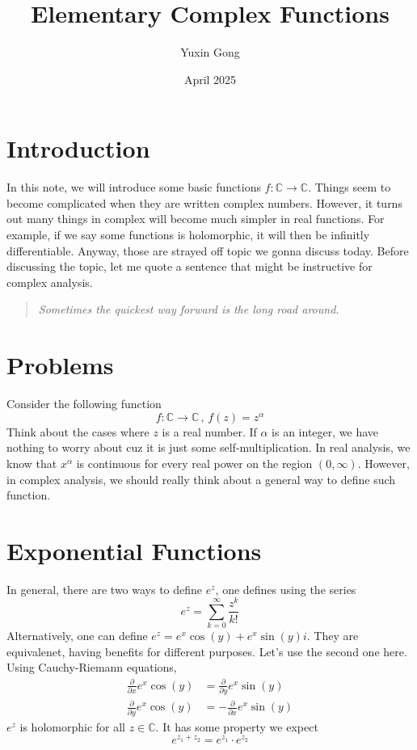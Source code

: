 \documentclass{article}
\title{Elementary Complex Functions}
\author{Yuxin Gong}
\date{April 2025}
\begin{document}
\maketitle
\section{Introduction}
In this note, we will introduce some basic functions $f : \mathbb{C} \to \mathbb{C}$.
Things seem to become complicated when they are written complex numbers.
However, it turns out many things in complex will become much simpler in 
real functions. For example, if we say some functions is holomorphic, it 
will then be infinitly differentiable. Anyway, those are strayed off topic we gonna
discuss today. Before discussing the topic, let me quote a sentence that might
be instructive for complex analysis.
\begin{quote}
    \textit{Sometimes the quickest way forward is the long road around.}
\end{quote}
\section{Problems}
Consider the following function
$$
f : \mathbb{C} \to \mathbb{C}\, , \, f(z) = z^\alpha
$$
Think about the cases where $z$ is a real number. If $\alpha$ is an integer, we have 
nothing to worry about cuz it is just some self-multiplication. In real analysis, we 
know that $x^{\alpha}$ is continuous for every real power on the region $(0, \infty)$.
However, in complex analysis, we should really think about a general way to 
define such function.
\section{Exponential Functions}
In general, there are two ways to define $e^z$, one defines using the series
$$
e^z = \sum_{k = 0}^{\infty} \frac{z^k}{k !}
$$
Alternatively, one can define $e^z = e^x \cos(y) + e^x \sin(y)i$. They are equivalenet, 
having benefits for different purposes. Let's use the second one here.
Using Cauchy-Riemann equations, 
\begin{align}
\frac{\partial }{\partial x}e^x \cos(y) &= \frac{\partial}{\partial y} e^x \sin(y) \\
\frac{\partial }{\partial y}e^x \cos(y) &= -\frac{\partial}{\partial x} e^x \sin(y)
\end{align}
$e^z$ is holomorphic for all $z \in \mathbb{C}$. It has some property we expect
$$
e^{z_1 + z_2} = e^{z_1} \cdot e^{z_2} 
$$
\end{document}
